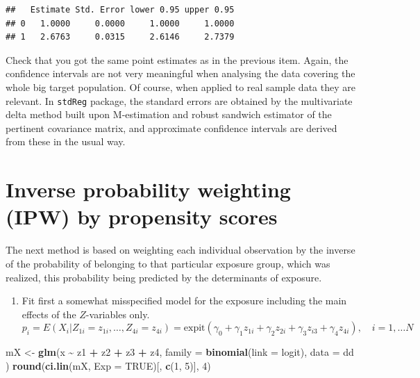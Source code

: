 \documentclass[
]{book}
\newenvironment{Shaded}{\begin{snugshade}}{\end{snugshade}}
\newcommand{\AttributeTok}[1]{\textcolor[rgb]{0.13,0.29,0.53}{#1}}
\newcommand{\ConstantTok}[1]{\textcolor[rgb]{0.56,0.35,0.01}{#1}}
\newcommand{\DecValTok}[1]{\textcolor[rgb]{0.00,0.00,0.81}{#1}}
\newcommand{\FunctionTok}[1]{\textcolor[rgb]{0.13,0.29,0.53}{\textbf{#1}}}
\newcommand{\NormalTok}[1]{#1}
\newcommand{\OtherTok}[1]{\textcolor[rgb]{0.56,0.35,0.01}{#1}}
\newcommand{\SpecialCharTok}[1]{\textcolor[rgb]{0.81,0.36,0.00}{\textbf{#1}}}
\providecommand{\tightlist}{%
  \setlength{\itemsep}{0pt}\setlength{\parskip}{0pt}}
\begin{document}
\begin{verbatim}
##   Estimate Std. Error lower 0.95 upper 0.95
## 0   1.0000     0.0000     1.0000     1.0000
## 1   2.6763     0.0315     2.6146     2.7379
\end{verbatim}

Check that you got the same point estimates as
in the previous item.
Again, the confidence intervals are not very
meaningful when analysing
the data covering the whole big target population.
Of course, when
applied to real sample data they are relevant.
In \texttt{stdReg} package, the
standard errors are obtained by the multivariate
delta method built upon
M-estimation and robust sandwich estimator of the
pertinent covariance
matrix, and approximate confidence intervals are derived
from these in the usual way.

\section{Inverse probability weighting (IPW) by propensity scores}\label{inverse-probability-weighting-ipw-by-propensity-scores}

The next method is based on weighting each individual
observation by the
inverse of the probability of belonging to that
particular exposure group, which was realized,
this probability being predicted by the
determinants of exposure.

\begin{enumerate}
\def\labelenumi{\arabic{enumi}.}
\tightlist
\item
  Fit first a somewhat misspecified
  model for the exposure including the main effects of the
  \(Z\)-variables only.
  \[ 
  p_i = E(X_i| Z_{1i} = z_{1i}, \dots, Z_{4i} = z_{4i})
  = \text{expit}(\gamma_0 + \gamma_1 z_{1i} + \gamma_2 z_{2i} +
     \gamma_3 z_{i3} + \gamma_4 z_{4i} ), \quad i=1, \dots N 
  \]
\end{enumerate}

\begin{Shaded}
\begin{Highlighting}[]
\NormalTok{mX }\OtherTok{\textless{}{-}} \FunctionTok{glm}\NormalTok{(x }\SpecialCharTok{\textasciitilde{}}\NormalTok{ z1 }\SpecialCharTok{+}\NormalTok{ z2 }\SpecialCharTok{+}\NormalTok{ z3 }\SpecialCharTok{+}\NormalTok{ z4,}
  \AttributeTok{family =} \FunctionTok{binomial}\NormalTok{(}\AttributeTok{link =}\NormalTok{ logit), }\AttributeTok{data =}\NormalTok{ dd}
\NormalTok{)}
\FunctionTok{round}\NormalTok{(}\FunctionTok{ci.lin}\NormalTok{(mX, }\AttributeTok{Exp =} \ConstantTok{TRUE}\NormalTok{)[, }\FunctionTok{c}\NormalTok{(}\DecValTok{1}\NormalTok{, }\DecValTok{5}\NormalTok{)], }\DecValTok{4}\NormalTok{)}
\end{Highlighting}
\end{Shaded}
\end{document}
